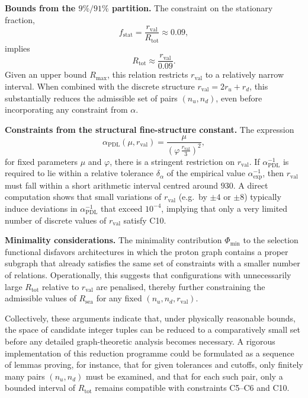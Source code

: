 \documentclass[11pt,a4paper]{article}
\begin{document}
\medskip
\noindent\textbf{Bounds from the $9\%/91\%$ partition.} The constraint on the stationary fraction,
\begin{equation}
f_{\mathrm{stat}} = \frac{r_{\mathrm{val}}}{R_{\mathrm{tot}}} \approx 0.09,
\end{equation}
implies
\begin{equation}
R_{\mathrm{tot}} \approx \frac{r_{\mathrm{val}}}{0.09}.
\end{equation}
Given an upper bound $R_{\max}$, this relation restricts $r_{\mathrm{val}}$ to a relatively narrow interval. When combined with the discrete structure $r_{\mathrm{val}} = 2r_u + r_d$, this substantially reduces the admissible set of pairs $(n_u,n_d)$, even before incorporating any constraint from $\alpha$.\cite{LaubscherPDLFull2026,LaubscherIMRadPDL2026}

\medskip
\noindent\textbf{Constraints from the structural fine-structure constant.} The expression
\begin{equation}
\alpha_{\mathrm{PDL}}(\mu,r_{\mathrm{val}}) = \frac {\mu}{\left(\varphi\,\frac{r_{\mathrm{val}}}{3}\right)^{2}},
\end{equation}
for fixed parameters $\mu$ and $\varphi$, there is a stringent restriction on $r_{\mathrm{val}}$. If $\alpha_{\mathrm{PDL}}^{-1}$ is required to lie within a relative tolerance $\delta_{\alpha}$ of the empirical value $\alpha_{\mathrm{exp}}^{-1}$, then $r_{\mathrm{val}}$ must fall within a short arithmetic interval centred around $930$. A direct computation shows that small variations of $r_{\mathrm{val}}$ (e.g.\ by $\pm 4$ or $\pm 8$) typically induce deviations in $\alpha_{\mathrm{PDL}}^{-1}$ that exceed $10^{-4}$, implying that only a very limited number of discrete values of $r_{\mathrm{val}}$ satisfy C10.\cite{LaubscherDerivationAlpha2026}

\medskip
\noindent\textbf{Minimality considerations.} The minimality contribution $\Phi_{\mathrm{min}}$ to the selection functional disfavors architectures in which the proton graph contains a proper subgraph that already satisfies the same set of constraints with a smaller number of relations. Operationally, this suggests that configurations with unnecessarily large $R_{\mathrm{tot}}$ relative to $r_{\mathrm{val}}$ are penalised, thereby further constraining the admissible values of $R_{\mathrm{sea}}$ for any fixed $(n_u,n_d,r_{\mathrm{val}})$.\cite{LaubscherPDLFull2026}

Collectively, these arguments indicate that, under physically reasonable bounds, the space of candidate integer tuples can be reduced to a comparatively small set before any detailed graph-theoretic analysis becomes necessary. A rigorous implementation of this reduction programme could be formulated as a sequence of lemmas proving, for instance, that for given tolerances and cutoffs, only finitely many pairs $(n_u,n_d)$ must be examined, and that for each such pair, only a bounded interval of $R_{\mathrm{tot}}$ remains compatible with constraints C5–C6 and C10.
\end{document}
